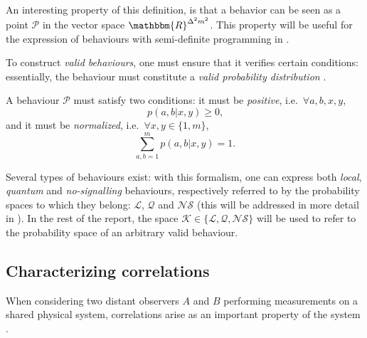 An interesting property of this definition, is that a behavior can be seen as a point $\mathcal{P}$ in the vector space $\mathbbm{R}^{\Delta^2 m^2}$. This property will be useful for the expression of behaviours with semi-definite programming in .

To construct \emph{valid behaviours}, one must ensure that it verifies certain conditions: essentially, the behaviour must constitute a \emph{valid probability distribution} \cite{brunner}.

\begin{proposition}
A behaviour $\mathcal{P}$ must satisfy two conditions: it must be \emph{positive}, i.e.\ $\forall a, b, x, y$,
\begin{equation}\label{eq:norm_cons_1}
    p(a,b|x,y) \geq 0 \text{,}
\end{equation}
and it must be \emph{normalized}, i.e.\ $\forall x,y \in \{1,m\}$,
\begin{equation}\label{eq:norm_cons_2}
\sum_{a,b=1}^m p(a,b|x,y) = 1 \text{.}
\end{equation}
\end{proposition}


Several types of behaviours exist: with this formalism, one can express both \emph{local}, \emph{quantum} and \emph{no-signalling} behaviours, respectively referred to by the probability spaces to which they belong: $\mathcal{L}$, $\mathcal{Q}$ and $\mathcal{NS}$ (this will be addressed in more detail in ). 
In the rest of the report, the space $\mathcal{K} \in \{\mathcal{L}, \mathcal{Q}, \mathcal{NS}\}$ will be used to refer to the probability space of an arbitrary valid behaviour.


\subsection{Characterizing correlations}
\label{sec:char-corr}

When considering two distant observers $A$ and $B$ performing measurements on a shared physical system, correlations arise as an important property of the system \cite{bell-viol-self-test}.

